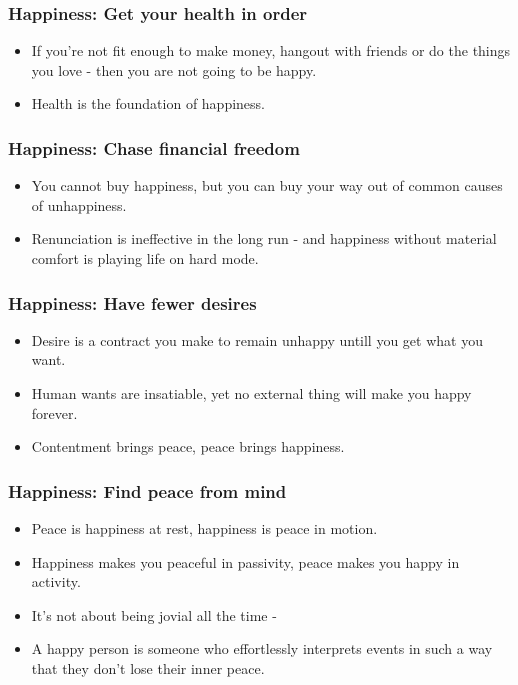 \begin{frame}[fragile]\frametitle{ Happiness: Get your health in order}
\begin{itemize}
\item If you’re not fit enough to make money, hangout with friends or do the things you love - then you are not going to be happy.
\item Health is the foundation of happiness.
\end{itemize}
\end{frame}

\begin{frame}[fragile]\frametitle{ Happiness: Chase financial freedom}
\begin{itemize}
\item You cannot buy happiness, but you can buy your way out of common causes of unhappiness.
\item Renunciation is ineffective in the long run - and happiness without material comfort is playing life on hard mode.
\end{itemize}
\end{frame}

\begin{frame}[fragile]\frametitle{ Happiness: Have fewer desires}
\begin{itemize}
\item Desire is a contract you make to remain unhappy untill you get what you want.
\item Human wants are insatiable, yet no external thing will make you happy forever.
\item Contentment brings peace, peace brings happiness.
\end{itemize}
\end{frame}

\begin{frame}[fragile]\frametitle{ Happiness: Find peace from mind}
\begin{itemize}
\item Peace is happiness at rest, happiness is peace in motion.
\item Happiness makes you peaceful in passivity, peace makes you happy in activity.
\item It’s not about being jovial all the time -
\item  A happy person is someone who effortlessly interprets events in such a way that they don’t lose their inner peace.
\end{itemize}
\end{frame}

